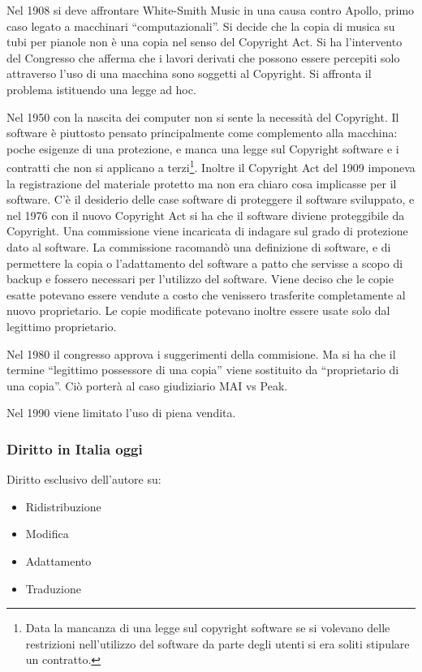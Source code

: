 Nel 1908 si deve affrontare White-Smith Music in una causa contro Apollo, primo caso legato a macchinari ``computazionali''. Si decide che la copia di musica su tubi per pianole non \`e una copia nel senso del Copyright Act. Si ha l'intervento del Congresso che afferma che i lavori derivati che possono essere percepiti solo attraverso l'uso di una macchina sono soggetti al Copyright. Si affronta il problema istituendo una legge ad hoc.

Nel 1950 con la nascita dei computer non si sente la necessit\`a del Copyright. Il software \`e piuttosto pensato principalmente come complemento alla macchina: poche esigenze di una protezione, e manca una legge sul Copyright software e i contratti che non si applicano a terzi\footnote{Data la mancanza di una legge sul copyright software se si volevano delle restrizioni nell'utilizzo del software da parte degli utenti si era soliti stipulare un contratto.}. Inoltre il Copyright Act del 1909 imponeva la registrazione del materiale protetto ma non era chiaro cosa implicasse per il software.
C'\`e il desiderio delle case software di proteggere il software sviluppato, e nel 1976 con il nuovo Copyright Act si ha che il software diviene proteggibile da Copyright. Una commissione viene incaricata di indagare sul grado di protezione dato al software. La commissione racomand\`o una definizione di software, e di permettere la copia o l'adattamento del software a patto che servisse a scopo di backup e fossero necessari per l'utilizzo del software. Viene deciso che le copie esatte potevano essere vendute a costo che venissero trasferite completamente al nuovo proprietario. Le copie modificate potevano inoltre essere usate solo dal legittimo proprietario.

Nel 1980 il congresso approva i suggerimenti della commisione. Ma si ha che il termine ``legittimo possessore di una copia'' viene sostituito da ``proprietario di una copia''. Ci\`o porter\`a al caso giudiziario MAI vs Peak.

Nel 1990 viene limitato l'uso di piena vendita.

\subsubsection{Diritto in Italia oggi}

Diritto esclusivo dell'autore su:
\begin{itemize}

\item Ridistribuzione
\item Modifica
\item Adattamento
\item Traduzione

\end{itemize}

